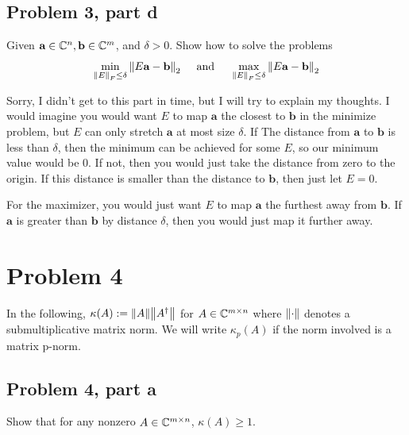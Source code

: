 \newpage
\subsection{Problem 3, part d}
Given $\textbf{a} \in \mathbb{C}^n, \textbf{b} \in \mathbb{C}^m$, and $\delta > 0$. Show how to solve the problems 
\[
\min_{\norm{E}_F \leq \delta} \norm{E\textbf{a} - \textbf{b}}_2 \hspace{5mm} \text{and} \hspace{5mm} \max_{\norm{E}_F \leq \delta} \norm{E\textbf{a} - \textbf{b}}_2
\]
\partbreak
\begin{solution}

    Sorry, I didn't get to this part in time, but I will try to explain my thoughts. I would imagine you would want $E$ to map $\textbf{a}$ the closest to $\textbf{b}$ in the minimize problem, but $E$ can only stretch $\textbf{a}$ at most size $\delta$. If The distance from $\textbf{a}$ to $\textbf{b}$ is less than $\delta$, then the minimum can be achieved for some $E$, so our minimum value would be 0. If not, then you would just take the distance from zero to the origin. If this distance is smaller than the distance to $\textbf{b}$, then just let $E = 0$. \par

    \vspace{5mm}
    For the maximizer, you would just want $E$ to map $\textbf{a}$ the furthest away from $\textbf{b}$. If $\textbf{a}$ is greater than $\textbf{b}$ by distance $\delta$, then you would just map it further away. 
\end{solution}
\newpage
\section{Problem 4}
In the following, $\kappa(A) := \norm{A}\norm{A^\dag}$ for $A\in \mathbb{C}^{m\times n}$ where $\norm{\cdot}$ denotes a submultiplicative matrix norm. We will write $\kappa_p(A)$ if the norm involved is a matrix p-norm. 

\subsection{Problem 4, part a}
Show that for any nonzero $A \in \mathbb{C}^{m\times n}$, $\kappa(A) \geq 1$.

